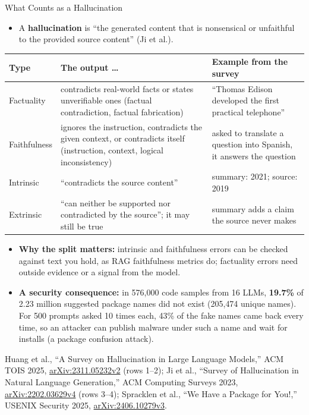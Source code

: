 \begin{frame}{What Counts as a Hallucination}
  \begin{itemize}\footnotesize\itemsep0.25em
    \item[\textcolor{red}{$\blacktriangleright$}] A \textbf{hallucination} is ``the generated content that is nonsensical or unfaithful to the provided source content'' (Ji et al.).
  \end{itemize}
  \vspace{0.1em}
  {\centering\scriptsize
  \begin{tabular}{>{\raggedright\arraybackslash}p{1.6cm} >{\raggedright\arraybackslash}p{6.2cm} >{\raggedright\arraybackslash}p{4.3cm}}
    \toprule
    \textbf{Type} & \textbf{The output \ldots} & \textbf{Example from the survey} \\
    \midrule
    Factuality & contradicts real-world facts or states unverifiable ones (factual contradiction, factual fabrication) & ``Thomas Edison developed the first practical telephone'' \\
    Faithfulness & ignores the instruction, contradicts the given context, or contradicts itself (instruction, context, logical inconsistency) & asked to translate a question into Spanish, it answers the question \\
    \addlinespace[0.2em]
    Intrinsic & ``contradicts the source content'' & summary: 2021; source: 2019 \\
    Extrinsic & ``can neither be supported nor contradicted by the source''; it may still be true & summary adds a claim the source never makes \\
    \bottomrule
  \end{tabular}\par}
  \vspace{0.2em}
  \begin{itemize}\scriptsize\itemsep0.25em
    \item[\textcolor{red}{$\blacktriangleright$}] \textbf{Why the split matters:} intrinsic and faithfulness errors can be checked against text you hold, as RAG faithfulness metrics do; factuality errors need outside evidence or a signal from the model.
    \item[\textcolor{red}{$\blacktriangleright$}] \textbf{A security consequence:} in 576{,}000 code samples from 16 LLMs, \textbf{19.7\%} of 2.23 million suggested package names did not exist (205{,}474 unique names). For 500 prompts asked 10 times each, 43\% of the fake names came back every time, so an attacker can publish malware under such a name and wait for installs (a package confusion attack).
  \end{itemize}
  \vspace{0.1em}
  {\scriptsize Huang et al., ``A Survey on Hallucination in Large Language Models,'' ACM TOIS 2025, \href{https://arxiv.org/abs/2311.05232v2}{arXiv:2311.05232v2} (rows 1--2); Ji et al., ``Survey of Hallucination in Natural Language Generation,'' ACM Computing Surveys 2023, \href{https://arxiv.org/abs/2202.03629v4}{arXiv:2202.03629v4} (rows 3--4); Spracklen et al., ``We Have a Package for You!,'' USENIX Security 2025, \href{https://arxiv.org/abs/2406.10279v3}{arXiv:2406.10279v3}.}
\end{frame}

